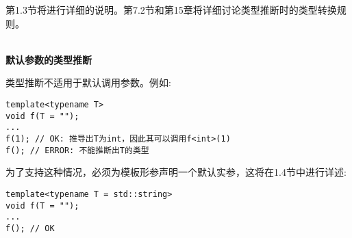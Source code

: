 第1.3节将进行详细的说明。第7.2节和第15章将详细讨论类型推断时的类型转换规则。

\hspace*{\fill} \\ %
\noindent
\textbf{默认参数的类型推断}

类型推断不适用于默认调用参数。例如:

\begin{lstlisting}[style=styleCXX]
template<typename T>
void f(T = "");
...
f(1); // OK: 推导出T为int，因此其可以调用f<int>(1)
f(); // ERROR: 不能推断出T的类型
\end{lstlisting}

为了支持这种情况，必须为模板形参声明一个默认实参，这将在1.4节中进行详述:

\begin{lstlisting}[style=styleCXX]
template<typename T = std::string>
void f(T = "");
...
f(); // OK
\end{lstlisting}














